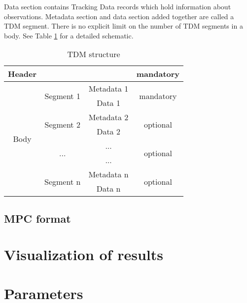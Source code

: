 	Data section contains Tracking Data records which hold information about observations. Metadata section and data section added together are called a TDM segment. There is no explicit limit on the number of TDM segments in a body. See Table \ref{tab:TDMtable} for a detailed schematic.
	
\begin{table}[H]
\centering
\caption{TDM structure}
\label{tab:TDMtable}
\begin{tabular}{|c|c|c|c|}
\hline
Header                & \multicolumn{2}{c|}{}                   & mandatory                  \\ \hline
\multirow{8}{*}{Body} & \multirow{2}{*}{Segment 1} & Metadata 1 & \multirow{2}{*}{mandatory} \\ \cline{3-3}
                      &                            & Data 1     &                            \\ \cline{2-4} 
                      & \multirow{2}{*}{Segment 2} & Metadata 2 & \multirow{2}{*}{optional}  \\ \cline{3-3}
                      &                            & Data 2     &                            \\ \cline{2-4} 
                      & \multirow{2}{*}{...}       & ...        & \multirow{2}{*}{optional}  \\ \cline{3-3}
                      &                            & ...        &                            \\ \cline{2-4} 
                      & \multirow{2}{*}{Segment n} & Metadata n & \multirow{2}{*}{optional}  \\ \cline{3-3}
                      &                            & Data n     &                            \\ \hline
\end{tabular}
\end{table}
		
	\citep{TDMdefinition}
		
\subsection{MPC format}

	\citep{mpc}

\section{Visualization of results}\label{sec:visualization}

\section{Parameters}\label{sec:parameters}
